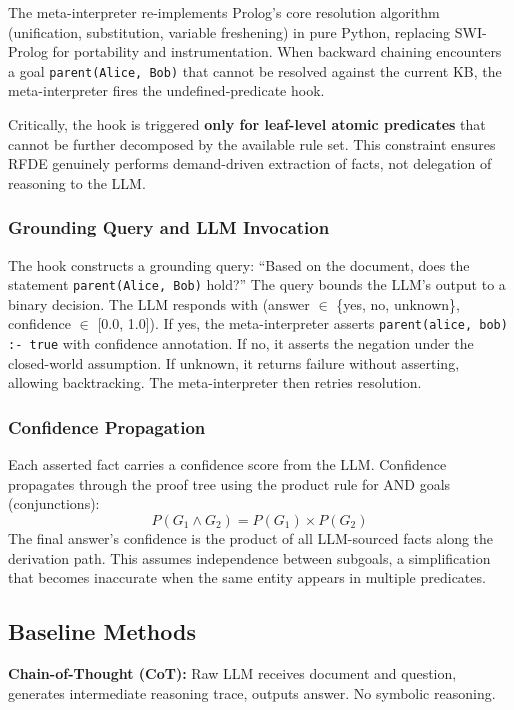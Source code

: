 \documentclass[11pt,letterpaper]{article}
\begin{document}
The meta-interpreter re-implements Prolog's core resolution algorithm (unification, substitution, variable freshening) in pure Python, replacing SWI-Prolog for portability and instrumentation. When backward chaining encounters a goal \texttt{parent(Alice, Bob)} that cannot be resolved against the current KB, the meta-interpreter fires the undefined-predicate hook.

Critically, the hook is triggered \textbf{only for leaf-level atomic predicates} that cannot be further decomposed by the available rule set. This constraint ensures RFDE genuinely performs demand-driven extraction of facts, not delegation of reasoning to the LLM.

\subsubsection{Grounding Query and LLM Invocation}

The hook constructs a grounding query: ``Based on the document, does the statement \texttt{parent(Alice, Bob)} hold?'' The query bounds the LLM's output to a binary decision. The LLM responds with (answer $\in$ \{yes, no, unknown\}, confidence $\in$ [0.0, 1.0]). If yes, the meta-interpreter asserts \texttt{parent(alice, bob) :- true} with confidence annotation. If no, it asserts the negation under the closed-world assumption. If unknown, it returns failure without asserting, allowing backtracking. The meta-interpreter then retries resolution.

\subsubsection{Confidence Propagation}

Each asserted fact carries a confidence score from the LLM. Confidence propagates through the proof tree using the product rule for AND goals (conjunctions):
\[
  P(G_1 \wedge G_2) = P(G_1) \times P(G_2)
\]
The final answer's confidence is the product of all LLM-sourced facts along the derivation path. This assumes independence between subgoals, a simplification that becomes inaccurate when the same entity appears in multiple predicates.

\subsection{Baseline Methods}

\textbf{Chain-of-Thought (CoT):} Raw LLM receives document and question, generates intermediate reasoning trace, outputs answer. No symbolic reasoning.
\end{document}
